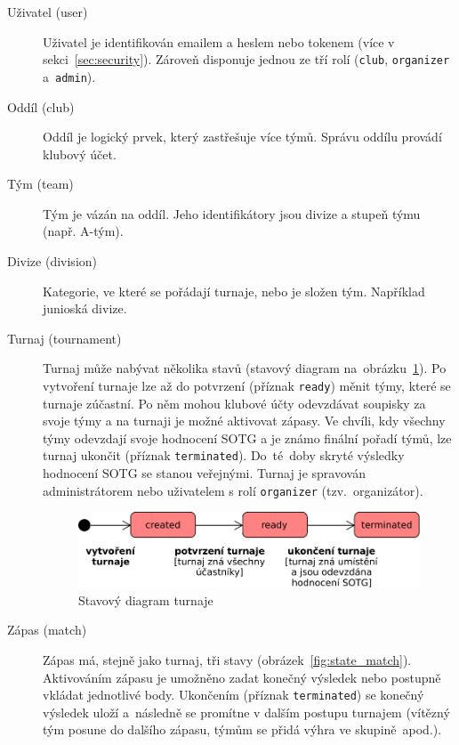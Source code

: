 \begin{description}
  \item[Uživatel (user)]
  Uživatel je identifikován emailem a heslem nebo tokenem (více v sekci~\ref{sec:security}).
  Zároveň disponuje jednou ze tří rolí (\texttt{club}, \texttt{organizer} a~\texttt{admin}).
  \item[Oddíl (club)]
  Oddíl je logický prvek, který zastřešuje více týmů. Správu oddílu provádí klubový účet.
  \item[Tým (team)]
  Tým je vázán na oddíl. Jeho identifikátory jsou divize a stupeň týmu (např. A-tým).
  \item[Divize (division)]
  Kategorie, ve které se pořádají turnaje, nebo je složen tým. Například junioská divize. %
  \item[Turnaj (tournament)]
    Turnaj může nabývat několika stavů (stavový diagram na~obrázku~\ref{fig:state_tournament}).
    Po vytvoření turnaje lze až do potvrzení (příznak \texttt{ready}) měnit týmy, které se turnaje zúčastní.
    Po něm mohou klubové účty odevzdávat soupisky za svoje týmy a na turnaji je možné aktivovat zápasy. Ve chvíli,
    kdy všechny týmy odevzdají svoje hodnocení SOTG a je známo finální pořadí týmů,
    lze turnaj ukončit (příznak \texttt{terminated}). Do~té~doby skryté výsledky hodnocení SOTG se stanou veřejnými.
    Turnaj je spravován administrátorem nebo uživatelem s rolí \texttt{organizer} (tzv.~organizátor).
    \begin{figure}[ht!]
      \centering
      \includegraphics[width=110mm]{./images/stavovy-diagram-turnaj.pdf}
      \caption{Stavový diagram turnaje\label{overflow}}
      \label{fig:state_tournament}
    \end{figure}
  \item[Zápas (match)]
    Zápas má, stejně jako turnaj, tři stavy (obrázek~\ref{fig:state_match}). Aktivováním zápasu je umožněno zadat konečný výsledek
    nebo postupně vkládat jednotlivé body. Ukončením (příznak \texttt{terminated}) se konečný výsledek uloží a~následně se promítne
    v dalším postupu turnajem (vítězný tým posune do dalšího zápasu, týmům se přidá výhra ve skupině~apod.).
    \begin{figure}[ht!]
      \centering

\end{figure}
\end{description}
